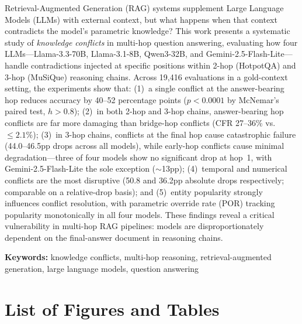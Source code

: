 \documentclass[12pt,a4paper]{article}
\begin{document}
\noindent
Retrieval-Augmented Generation (RAG) systems supplement Large Language Models (LLMs) with external context, but what happens when that context contradicts the model's parametric knowledge? This work presents a systematic study of \emph{knowledge conflicts} in multi-hop question answering, evaluating how four LLMs---Llama-3.3-70B, Llama-3.1-8B, Qwen3-32B, and Gemini-2.5-Flash-Lite---handle contradictions injected at specific positions within 2-hop (HotpotQA) and 3-hop (MuSiQue) reasoning chains. Across 19,416 evaluations in a gold-context setting, the experiments show that: (1)~a single conflict at the answer-bearing hop reduces accuracy by 40--52 percentage points ($p < 0.0001$ by McNemar's paired test, $h > 0.8$); (2)~in both 2-hop and 3-hop chains, answer-bearing hop conflicts are far more damaging than bridge-hop conflicts (CFR 27--36\% vs.\ $\leq 2.1\%$); (3)~in 3-hop chains, conflicts at the final hop cause catastrophic failure (44.0--46.5pp drops across all models), while early-hop conflicts cause minimal degradation---three of four models show no significant drop at hop~1, with Gemini-2.5-Flash-Lite the sole exception ($\sim$13pp); (4)~temporal and numerical conflicts are the most disruptive (50.8 and 36.2pp absolute drops respectively; comparable on a relative-drop basis); and (5)~entity popularity strongly influences conflict resolution, with parametric override rate (POR) tracking popularity monotonically in all four models. These findings reveal a critical vulnerability in multi-hop RAG pipelines: models are disproportionately dependent on the final-answer document in reasoning chains.

\vspace{1em}
\noindent\textbf{Keywords:} knowledge conflicts, multi-hop reasoning, retrieval-augmented generation, large language models, question answering

\newpage
\tableofcontents

\newpage
\renewcommand{\listfigurename}{Figures}
\renewcommand{\listtablename}{Tables}
\makeatletter
\let\origmkboth\@mkboth
\def\@mkboth#1#2{}
\makeatother
{}
\section*{List of Figures and Tables}
\listoffigures
\listoftables
\makeatletter
\let\@mkboth\origmkboth
\makeatother
\end{document}
